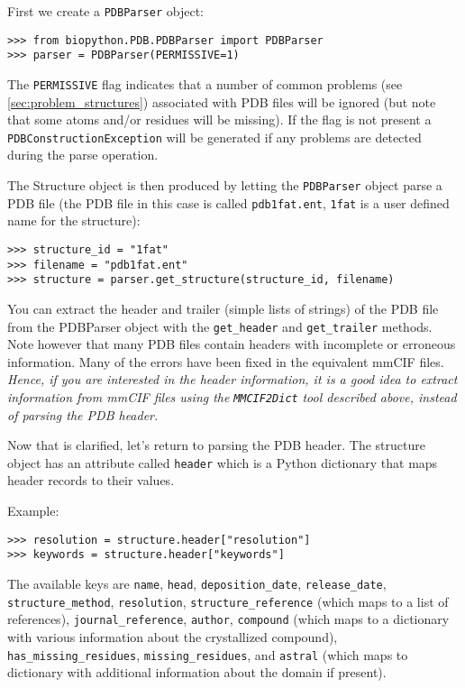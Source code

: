 First we create a \texttt{PDBParser} object:

\begin{verbatim}
>>> from biopython.PDB.PDBParser import PDBParser
>>> parser = PDBParser(PERMISSIVE=1)
\end{verbatim}

The \texttt{PERMISSIVE} flag indicates that a number of common problems (see \ref{sec:problem_structures}) associated with PDB files will be ignored (but note that some atoms and/or residues will be missing). If the flag is not present a \texttt{PDBConstructionException} will be generated if any problems are detected during the parse operation.

The Structure object is then produced by letting the \texttt{PDBParser} object parse a PDB file (the PDB file in this case is called \verb|pdb1fat.ent|, \verb|1fat| is a user defined name for the structure):

\begin{verbatim}
>>> structure_id = "1fat"
>>> filename = "pdb1fat.ent"
>>> structure = parser.get_structure(structure_id, filename)
\end{verbatim}

You can extract the header and trailer (simple lists of strings) of the PDB
file from the PDBParser object with the \texttt{get\_header} and \texttt{get\_trailer}
methods.  Note however that many PDB files contain headers with
incomplete or erroneous information. Many of the errors have been
fixed in the equivalent mmCIF files. \emph{Hence, if you are interested
in the header information, it is a good idea to extract information
from mmCIF files using the} \texttt{\emph{MMCIF2Dict}} \emph{tool
described above, instead of parsing the PDB header. }

Now that is clarified, let's return to parsing the PDB header. The
structure object has an attribute called \texttt{header} which is
a Python dictionary that maps header records to their values.

Example:

\begin{verbatim}
>>> resolution = structure.header["resolution"]
>>> keywords = structure.header["keywords"]
\end{verbatim}
The available keys are \verb+name+, \verb+head+, \verb+deposition_date+, 
\verb+release_date+, \verb+structure_method+, \verb+resolution+, 
\verb+structure_reference+ (which maps to a list of references),
\verb+journal_reference+, \verb+author+, \verb+compound+ (which maps to
a dictionary with various information about the crystallized compound),
\verb+has_missing_residues+, \verb+missing_residues+, and \verb+astral+ 
(which maps to dictionary with additional information about the domain if present).

